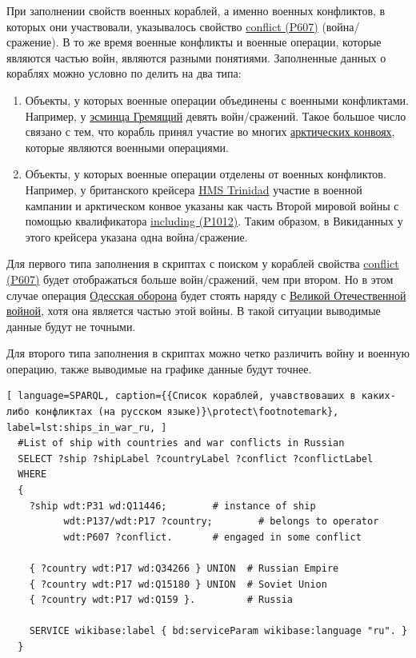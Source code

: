 При заполнении свойств военных кораблей, а именно военных конфликтов, в которых они участвовали, указывалось свойство \href{https://www.wikidata.org/wiki/Property:P607}{conflict (P607)} (война/сражение). В то же время военные конфликты и военные операции, которые являются частью войн, являются разными понятиями. Заполненные данных о кораблях можно условно по делить на два типа:

\begin{enumerate}
  \item Объекты, у которых военные операции объединены с военными конфликтами. Например, у \href{https://www.wikidata.org/wiki/Q4148613}{эсминца Гремящий} девять войн/сражений. Такое большое число связано с тем, что корабль принял участие во многих \href{https://ru.wikipedia.org/wiki/Арктические_конвои}{арктических конвоях}, которые являются военными операциями.
  \item Объекты, у которых военные операции отделены от военных конфликтов. Например, у британского крейсера \href{https://ru.wikipedia.org/wiki/HMS_Trinidad_(1940)}{HMS Trinidad} участие в военной кампании и арктическом конвое указаны как часть Второй мировой войны с помощью квалификатора \href{https://www.wikidata.org/wiki/Property:P1012}{including (P1012)}. Таким образом, в Викиданных у этого крейсера указана одна война/сражение.
\end{enumerate}

Для первого типа заполнения в скриптах с поиском у кораблей свойства \href{https://www.wikidata.org/wiki/Property:P607}{conflict (P607)} будет отображаться больше войн/сражений, чем при втором. Но в этом случае операция \href{https://ru.wikipedia.org/wiki/Одесская_оборона_(1941)}{Одесская оборона} будет стоять наряду с \href{https://ru.wikipedia.org/wiki/Великая_Отечественная_война}{Великой Отечественной войной}, хотя она является частью этой войны. В такой ситуации выводимые данные будут не точными.

Для второго типа заполнения в скриптах можно четко различить войну и военную операцию, также выводимые на графике данные будут точнее.


\begin{lstlisting}[ language=SPARQL, caption={{Список кораблей, учавствоваших в каких-либо конфликтах (на русском языке)}\protect\footnotemark}, label=lst:ships_in_war_ru, ]
  #List of ship with countries and war conflicts in Russian
  SELECT ?ship ?shipLabel ?countryLabel ?conflict ?conflictLabel
  WHERE
  {
    ?ship wdt:P31 wd:Q11446;        # instance of ship
          wdt:P137/wdt:P17 ?country;        # belongs to operator
          wdt:P607 ?conflict.       # engaged in some conflict
    
    { ?country wdt:P17 wd:Q34266 } UNION  # Russian Empire
    { ?country wdt:P17 wd:Q15180 } UNION  # Soviet Union
    { ?country wdt:P17 wd:Q159 }.         # Russia
    
    SERVICE wikibase:label { bd:serviceParam wikibase:language "ru". }
  }
\end{lstlisting}
